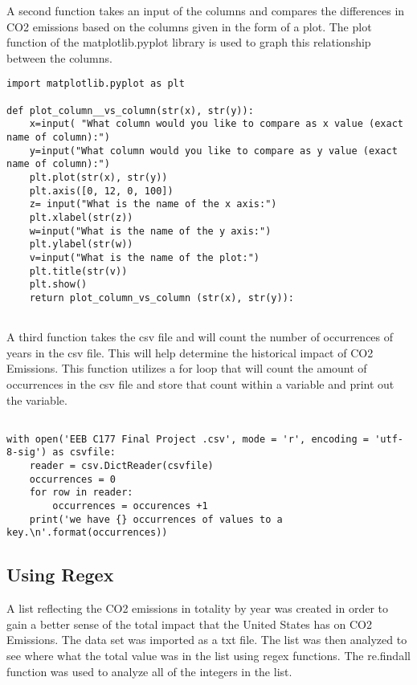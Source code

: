 \documentclass[letterpaper]{article}
\begin{document}
A second function takes an input of the columns and compares the differences in CO2 emissions based on the columns given in the form of a plot. The plot function of the matplotlib.pyplot library is used to graph this relationship between the columns. 

\vspace{0.25cm}

\lstset{language=Python}
\begin{lstlisting}[frame=single]
import matplotlib.pyplot as plt

def plot_column__vs_column(str(x), str(y)):
    x=input( "What column would you like to compare as x value (exact name of column):")
    y=input("What column would you like to compare as y value (exact name of column):")
    plt.plot(str(x), str(y))
    plt.axis([0, 12, 0, 100])
    z= input("What is the name of the x axis:")
    plt.xlabel(str(z))
    w=input("What is the name of the y axis:")
    plt.ylabel(str(w))
    v=input("What is the name of the plot:")
    plt.title(str(v))
    plt.show()
    return plot_column_vs_column (str(x), str(y)):
    
\end{lstlisting}

A third function takes the csv file and will count the number of occurrences of years in the csv file. This will help determine the historical impact of CO2 Emissions. This function utilizes a for loop that will count the amount of occurrences in the csv file and store that count within a variable and print out the variable. 

\lstset{language=Python}
\begin{lstlisting}[frame=single]

with open('EEB C177 Final Project .csv', mode = 'r', encoding = 'utf-8-sig') as csvfile:
    reader = csv.DictReader(csvfile)
    occurrences = 0
    for row in reader:
        occurrences = occurences +1
    print('we have {} occurrences of values to a key.\n'.format(occurrences))

\end{lstlisting}

\subsection{Using Regex}

A list reflecting the CO2 emissions in totality by year was created in order to gain a better sense of the total impact that the United States has on CO2 Emissions. The data set was imported as a txt file. The list was then analyzed to see where what the total value was in the list using regex functions. The re.findall function was used to analyze all of the integers in the list. 
\end{document}
